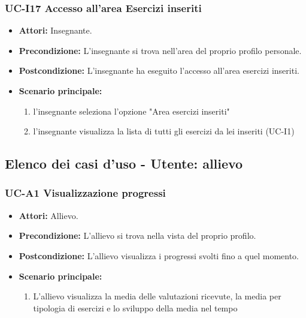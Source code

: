 \subsubsection{UC-I17 Accesso all'area Esercizi inseriti}		
\begin{itemize}
	\item \textbf{Attori:} Insegnante.
	\item \textbf{Precondizione:} L'insegnante si trova nell'area del proprio profilo personale.
	\item \textbf{Postcondizione:} L'insegnante ha eseguito l'accesso all'area esercizi inseriti.
	\item \textbf{Scenario principale:}
	\begin{enumerate}
		\item l'insegnante seleziona l'opzione "Area esercizi inseriti"
		\item l'insegnante visualizza la lista di tutti gli esercizi da lei inseriti (UC-I1)
	\end{enumerate}	
\end{itemize}

\subsection{Elenco dei casi d'uso - Utente: allievo}
	\subsubsection{UC-A1 Visualizzazione progressi}
	\begin{itemize}
			\item \textbf{Attori:} Allievo.
			\item \textbf{Precondizione:} L'allievo si trova nella vista del proprio profilo.
			\item \textbf{Postcondizione:} L'allievo visualizza i progressi svolti fino a quel momento.
			\item \textbf{Scenario principale:}
				\begin{enumerate}
					\item L'allievo visualizza la media delle valutazioni ricevute, la media per tipologia di esercizi e lo sviluppo della media nel tempo
				\end{enumerate}
	\end{itemize}
	
